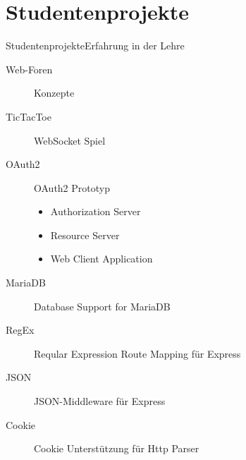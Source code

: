 ﻿\part[nopartpage]{Studentenprojekte}

\begin{frame}{Studentenprojekte}{Erfahrung in der Lehre}
  \begin{description}
    \item [Web-Foren] Konzepte
    \item [TicTacToe] WebSocket Spiel \href{https://github.com/hierischmarkus/tiktaktoe}{}
    \item [OAuth2] OAuth2 Prototyp \href{https://github.com/VolkerChristian/snode.c/pull/17}{}
    \begin{itemize}
      \item Authorization Server
      \item Resource Server
      \item Web Client Application
    \end{itemize}
    \item [MariaDB] Database Support for MariaDB \href{https://github.com/VolkerChristian/snode.c/pull/14}{}
    \item [RegEx] Reqular Expression Route Mapping für Express \href{https://github.com/VolkerChristian/snode.c/pull/10}{}
    \item [JSON] JSON-Middleware für Express \href{https://github.com/VolkerChristian/snode.c/pull/12}{}
    \item [Cookie] Cookie Unterstützung für Http Parser \href{https://github.com/VolkerChristian/snode.c/pull/2}{}
  \end{description}
\end{frame}
